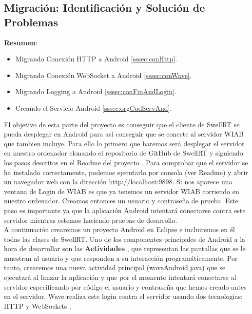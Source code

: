 	\subsection{Migración: Identificación y Solución de Problemas}
	
	\textbf{Resumen}:
	
	\begin{itemize}
	  \item Migrando Conexión HTTP a Android \ref{sssec:conHttp}.
	  \item Migrando Conexión WebSocket a Android \ref{sssec:conWave}.
	  \item Migrando Logging a Android \ref{sssec:conFinAndLogin}.
	  \item Creando el Servicio Android \ref{sssec:orgCodServAnd}.
	\end{itemize}

	  El objetivo de esta parte del proyecto es conseguir que el cliente de SwellRT se pueda desplegar en Android para asi conseguir que se conecte al servidor WIAB que tambien incluye. Para ello lo primero que haremos será desplegar el servidor en nuestro ordenador clonando el repositorio de GitHub de SwellRT y siguiendo los pasos descritos en el Readme del proyecto \cite{ref:swellRT_github}. Para comprobar que el servidor se ha instalado correctamente, podemos ejecutarlo por consola (ver Readme) y abrir un navegador web con la dirección http://localhost:9898. Si nos aparece una ventana de Login de WIAB es que ya tenemos un servidor WIAB corriendo en nuestro ordenador. Creamos entonces un usuario y contraseña de prueba. Este paso es importante ya que la aplicación Android intentará conectarse contra este servidor mientras estemos haciendo pruebas de desarrollo. \\[.2cm]
	  
	  A continuación crearemos un proyecto Android en Eclipse e incluiremos en él todas las clases de SwellRT. Uno de los componentes principales de Android a la hora de desarrollar son las \textbf{Actividades} \cite{ref:android_activities}, que representan las pantallas que se le muestran al usuario y que responden a su interacción programáticamente. Por tanto, crearemos una nueva actividad  principal (waveAndroid.java) que se ejecutará al lanzar la aplicación y que por el momento intentará conectarse al servidor especificando por código el usuario y contraseña que hemos creado antes en el servidor. Wave realiza este login contra el servidor usando dos tecnologias: HTTP \cite{ref:http_authentication} y WebSockets \cite{ref:webSocket_ref}.
	  
